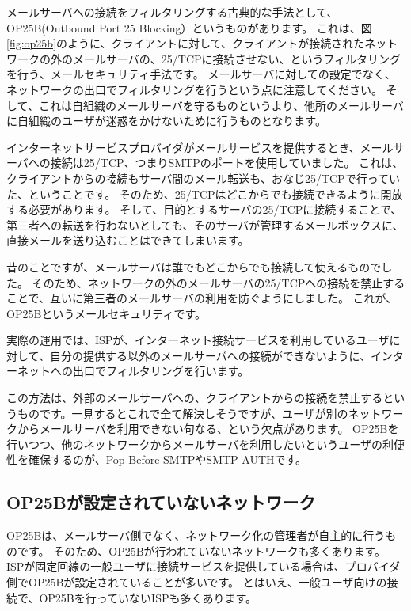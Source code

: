 メールサーバへの接続をフィルタリングする古典的な手法として、OP25B(Outbound Port 25 Blocking）というものがあります。
これは、図\ref{fig:op25b}のように、クライアントに対して、クライアントが接続されたネットワークの外のメールサーバの、25/TCPに接続させない、というフィルタリングを行う、メールセキュリティ手法です。
メールサーバに対しての設定でなく、ネットワークの出口でフィルタリングを行うという点に注意してください。
そして、これは自組織のメールサーバを守るものというより、他所のメールサーバに自組織のユーザが迷惑をかけないために行うものとなります。

インターネットサービスプロバイダがメールサービスを提供するとき、メールサーバへの接続は25/TCP、つまりSMTPのポートを使用していました。
これは、クライアントからの接続もサーバ間のメール転送も、おなじ25/TCPで行っていた、ということです。
そのため、25/TCPはどこからでも接続できるように開放する必要があります。
そして、目的とするサーバの25/TCPに接続することで、第三者への転送を行わないとしても、そのサーバが管理するメールボックスに、直接メールを送り込むことはできてしまいます。

昔のことですが、メールサーバは誰でもどこからでも接続して使えるものでした。
そのため、ネットワークの外のメールサーバの25/TCPへの接続を禁止することで、互いに第三者のメールサーバの利用を防ぐようにしました。
これが、OP25Bというメールセキュリティです。

実際の運用では、ISPが、インターネット接続サービスを利用しているユーザに対して、自分の提供する以外のメールサーバへの接続ができないように、インターネットへの出口でフィルタリングを行います。

この方法は、外部のメールサーバへの、クライアントからの接続を禁止するというものです。一見するとこれで全て解決しそうですが、ユーザが別のネットワークからメールサーバを利用できない句なる、という欠点があります。
OP25Bを行いつつ、他のネットワークからメールサーバを利用したいというユーザの利便性を確保するのが、Pop Before SMTPやSMTP-AUTHです。

\subsection{OP25Bが設定されていないネットワーク}

OP25Bは、メールサーバ側でなく、ネットワーク化の管理者が自主的に行うものです。
そのため、OP25Bが行われていないネットワークも多くあります。
ISPが固定回線の一般ユーザに接続サービスを提供している場合は、プロバイダ側でOP25Bが設定されていることが多いです。
とはいえ、一般ユーザ向けの接続で、OP25Bを行っていないISPも多くあります。

